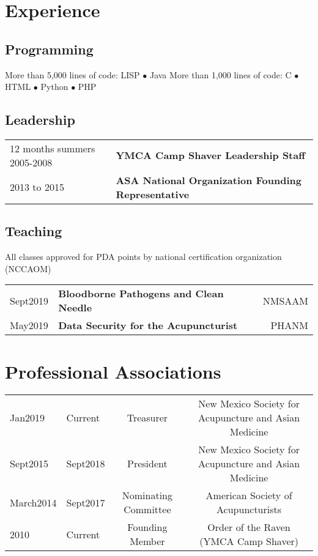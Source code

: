 \documentclass{myres}
\begin{document}
\section{Experience}
\vspace{-.5em}
\subsection{Programming}
\vspace{-.5em}
{\latog\selectfont More than 5,000 lines of code:} LISP $\bullet$ Java
{\latog\selectfont More than 1,000 lines of code:} C $\bullet$ HTML $\bullet$ Python $\bullet$ PHP
\subsection{Leadership}
\vspace{-.5em}
\begin{tabularx}{\textwidth}{@{} l X}
12 months summers 2005-2008 & \textbf{YMCA Camp Shaver Leadership Staff}\\
2013 to 2015 & \textbf{ASA National Organization Founding Representative}\\
\end{tabularx}
\subsection{Teaching}
\vspace{-.5em}
All classes approved for PDA points by national certification organization (NCCAOM)\\
\begin{tabularx}{\textwidth}{@{} l X R}
Sept2019 & \textbf{Bloodborne Pathogens and Clean Needle} & NMSAAM\\
May2019 & \textbf{Data Security for the Acupuncturist} & PHANM\\
\end{tabularx}
\myendsec

\section{Professional Associations}
\begin{tabular}{@{} l l c c}
Jan2019 & Current & Treasurer & New Mexico Society for Acupuncture and Asian Medicine\\
Sept2015 & Sept2018 & President & New Mexico Society for Acupuncture and Asian Medicine\\
March2014 & Sept2017 & Nominating Committee & American Society of Acupuncturists\\
2010 & Current & Founding Member & Order of the Raven (YMCA Camp Shaver)\\
\end{tabular}
\end{document}
